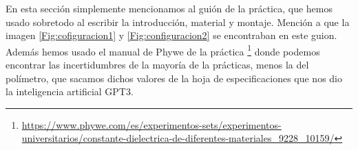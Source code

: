 \documentclass[12pt,a4paper]{article}
\begin{document}
En esta sección simplemente mencionamos al guión de la práctica, que hemos usado sobretodo al escribir la introducción, material y montaje. Mención a que la imagen \ref{Fig:cofiguracion1} y \ref{Fig:configuracion2} se encontraban en este guion. Además hemos usado el manual de Phywe de la práctica \footnote{	\textcolor{blue}{\url{https://www.phywe.com/es/experimentos-sets/experimentos-universitarios/constante-dielectrica-de-diferentes-materiales_9228_10159/}}} donde podemos encontrar las incertidumbres de la mayoría de la prácticas, menos la del polímetro, que sacamos dichos valores de la hoja de especificaciones que nos dio la inteligencia artificial GPT3. 




 
\end{document}
